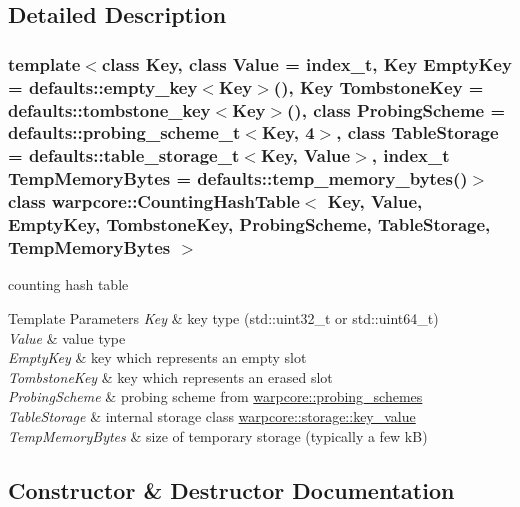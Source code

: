 \subsection{Detailed Description}
\subsubsection*{template$<$class Key, class Value = index\+\_\+t, Key Empty\+Key = defaults\+::empty\+\_\+key$<$\+Key$>$(), Key Tombstone\+Key = defaults\+::tombstone\+\_\+key$<$\+Key$>$(), class Probing\+Scheme = defaults\+::probing\+\_\+scheme\+\_\+t$<$\+Key, 4$>$, class Table\+Storage = defaults\+::table\+\_\+storage\+\_\+t$<$\+Key, Value$>$, index\+\_\+t Temp\+Memory\+Bytes = defaults\+::temp\+\_\+memory\+\_\+bytes()$>$\newline
class warpcore\+::\+Counting\+Hash\+Table$<$ Key, Value, Empty\+Key, Tombstone\+Key, Probing\+Scheme, Table\+Storage, Temp\+Memory\+Bytes $>$}

counting hash table 


\begin{DoxyTemplParams}{Template Parameters}
{\em Key} & key type ({\ttfamily std\+::uint32\+\_\+t} or {\ttfamily std\+::uint64\+\_\+t}) \\
\hline
{\em Value} & value type \\
\hline
{\em Empty\+Key} & key which represents an empty slot \\
\hline
{\em Tombstone\+Key} & key which represents an erased slot \\
\hline
{\em Probing\+Scheme} & probing scheme from {\ttfamily \hyperlink{namespacewarpcore_1_1probing__schemes}{warpcore\+::probing\+\_\+schemes}} \\
\hline
{\em Table\+Storage} & internal storage class {\ttfamily \hyperlink{namespacewarpcore_1_1storage_1_1key__value}{warpcore\+::storage\+::key\+\_\+value}} \\
\hline
{\em Temp\+Memory\+Bytes} & size of temporary storage (typically a few kB) \\
\hline
\end{DoxyTemplParams}


\subsection{Constructor \& Destructor Documentation}
\mbox{\label{classwarpcore_1_1CountingHashTable_a68946e67712e7b2afb95ddb7169a26fd}} 
